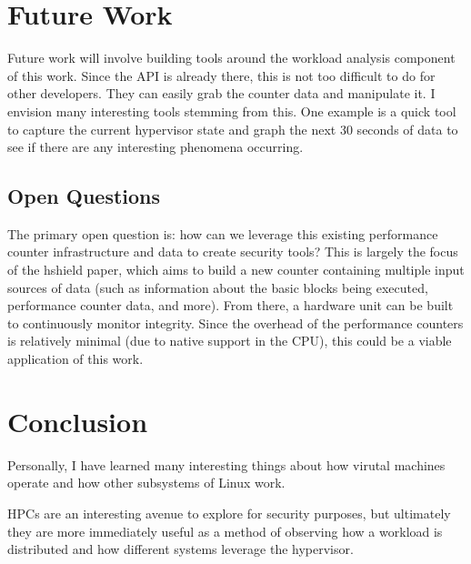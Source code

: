 \documentclass[notitlepage]{article}
\begin{document}
\section{Future Work}
\label{sec:futurework}
Future work will involve building tools around the workload analysis component
of this work. Since the API is already there, this is not too difficult to do
for other developers. They can easily grab the counter data and manipulate it. I
envision many interesting tools stemming from this. One example is a quick tool
to capture the current hypervisor state and graph the next 30 seconds of data to
see if there are any interesting phenomena occurring.

\subsection{Open Questions}
The primary open question is: how can we leverage this existing performance
counter infrastructure and data to create security tools? This is largely the
focus of the hshield %
paper, which aims to build a new counter containing multiple input sources of
data (such as information about the basic blocks being executed, performance
counter data, and more). From there, a hardware unit can be built to
continuously monitor integrity. Since the overhead of the performance counters
is relatively minimal (due to native support in the CPU), this could be a viable
application of this work.


\section{Conclusion}
\label{sec:conclusion}
Personally, I have learned many interesting things about how virutal machines
operate and how other subsystems of Linux work.

HPCs are an interesting avenue to explore for security purposes, but ultimately
they are more immediately useful as a method of observing how a workload is
distributed and how different systems leverage the hypervisor.


\newpage

\nocite{*}

{}

\end{document}
